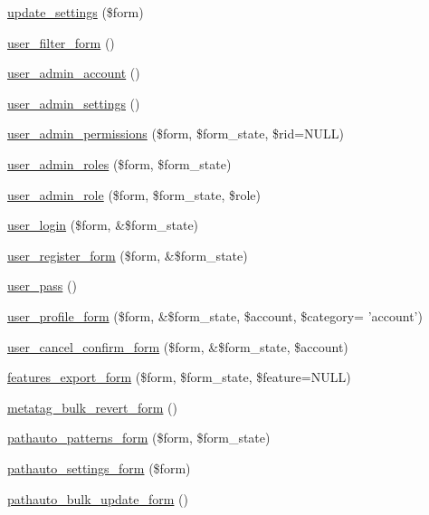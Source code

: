\begin{DoxyCompactItemize}
\item 
\hyperlink{group__forms_gaef8e4ae13223ebb2175505c22c6f6fa8}{update\_\-settings} (\$form)
\item 
\hyperlink{group__forms_ga4492f8566743ff967248ff7d22108a54}{user\_\-filter\_\-form} ()
\item 
\hyperlink{group__forms_ga3dde5a35fbda589c3fb9a4bb6d4b1d9a}{user\_\-admin\_\-account} ()
\item 
\hyperlink{group__forms_ga8cb1bc70278e0e628fd17c2ec8353bd1}{user\_\-admin\_\-settings} ()
\item 
\hyperlink{group__forms_gabcf8ce0bd54bdce14e7abeea7ed2bad9}{user\_\-admin\_\-permissions} (\$form, \$form\_\-state, \$rid=NULL)
\item 
\hyperlink{group__forms_ga80c86a9ecd42e3a8b2518d23cf9b0b84}{user\_\-admin\_\-roles} (\$form, \$form\_\-state)
\item 
\hyperlink{group__forms_ga1b97a1d994a0fff5e514d8c0b79b9d9f}{user\_\-admin\_\-role} (\$form, \$form\_\-state, \$role)
\item 
\hyperlink{group__forms_gac2d24ff71cebbfa81b8324ac1d9edfe2}{user\_\-login} (\$form, \&\$form\_\-state)
\item 
\hyperlink{group__forms_ga6dc04f116a25059727b3cf9e15205be8}{user\_\-register\_\-form} (\$form, \&\$form\_\-state)
\item 
\hyperlink{group__forms_gad7f952e136ebcff493ca8de7209100cf}{user\_\-pass} ()
\item 
\hyperlink{group__forms_ga600bbf7cf395cbfedae1c3bc33727346}{user\_\-profile\_\-form} (\$form, \&\$form\_\-state, \$account, \$category= 'account')
\item 
\hyperlink{group__forms_ga75a9df042449e7fc294c418083052114}{user\_\-cancel\_\-confirm\_\-form} (\$form, \&\$form\_\-state, \$account)
\item 
\hyperlink{group__forms_gac6d72d74ab676748b1197536446c1063}{features\_\-export\_\-form} (\$form, \$form\_\-state, \$feature=NULL)
\item 
\hyperlink{group__forms_ga73f02a09e1068de6e28ae97baa10a041}{metatag\_\-bulk\_\-revert\_\-form} ()
\item 
\hyperlink{group__forms_ga2b3adb295ed84c13148b9c34ce0b3b73}{pathauto\_\-patterns\_\-form} (\$form, \$form\_\-state)
\item 
\hyperlink{group__forms_ga59b24f3617ff78cc8c9d8b3b4990b6e2}{pathauto\_\-settings\_\-form} (\$form)
\item 
\hyperlink{group__forms_gadbfac53f8f52a25ad1d4b1a59bf8b907}{pathauto\_\-bulk\_\-update\_\-form} ()
\end{DoxyCompactItemize}


